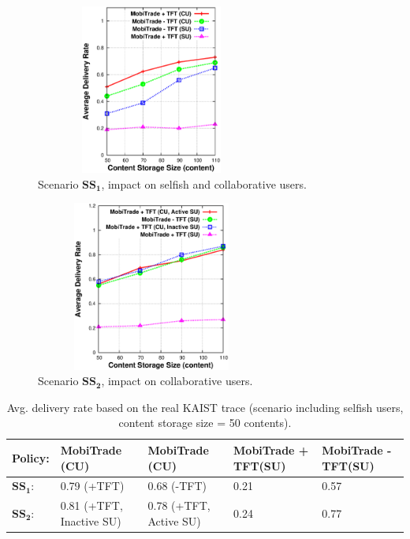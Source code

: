 \begin{figure}[!h]
  \begin{center}
    \includegraphics[width=3in,height=2.2in]{Chapitre5/fig1.eps}
  \end{center}
  \caption{Scenario $\mathbf{SS_1}$, impact on selfish and collaborative users.}
  \label{SS-Scenario-1}
\end{figure}

\begin{figure}[!h]
  \begin{center}
    \includegraphics[width=3in,height=2.2in]{Chapitre5/fig6.eps}
  \end{center}
  \caption{Scenario $\mathbf{SS_2}$, impact on collaborative users.}
  \label{MN+ECH+ICN}
\end{figure}

\begin{table}[!h]
\vspace{-0.1in}
\caption{Avg. delivery rate based on the real KAIST trace (scenario including selfish users, content storage size = 50 contents).}
\centering
\label{table:kaist:mal}
\footnotesize
\begin{tabular}{|p{1.5cm}|p{2.5cm}|p{2.5cm}|p{2.5cm}|p{2.5cm}|}
\hline
\bfseries Policy:& \bfseries MobiTrade (CU) & \bfseries MobiTrade (CU)& \bfseries MobiTrade + TFT(SU) & \bfseries MobiTrade - TFT(SU)\\
\hline
$\mathbf{SS_{1}}$: & 0.79 (+TFT)& 0.68 (-TFT) & 0.21& 0.57 \\
\hline
$\mathbf{SS_{2}}$: & 0.81 (+TFT, Inactive SU) & 0.78 (+TFT, Active SU) &0.24&0.77\\
\hline
\end{tabular}
\end{table}

